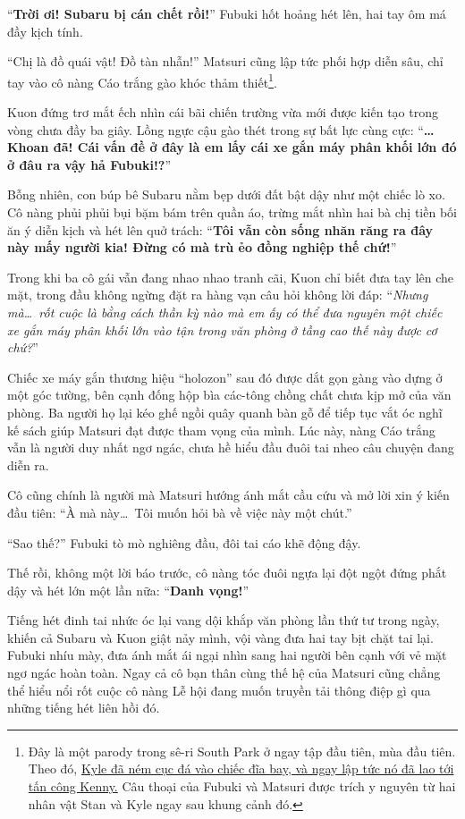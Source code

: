 \documentclass[../main.tex]{subfiles}
\begin{document}
``\textbf{Trời ơi! Subaru bị cán chết rồi!}'' Fubuki hốt hoảng hét lên, hai tay ôm má đầy kịch tính.

``Chị là đồ quái vật! Đồ tàn nhẫn!'' Matsuri cũng lập tức phối hợp diễn sâu, chỉ tay vào cô nàng Cáo trắng gào khóc thảm thiết\footnote{Đây là một parody trong sê-ri South Park ở ngay tập đầu tiên, mùa đầu tiên. Theo đó, \href{https://www.youtube.com/watch?v=kXxr9A_UBG4}{Kyle đã ném cục đá vào chiếc đĩa bay, và ngay lập tức nó đã lao tới tấn công Kenny.} Câu thoại của Fubuki và Matsuri được trích y nguyên từ hai nhân vật Stan và Kyle ngay sau khung cảnh đó.}.

Kuon đứng trơ mắt ếch nhìn cái bãi chiến trường vừa mới được kiến tạo trong vòng chưa đầy ba giây. Lồng ngực cậu gào thét trong sự bất lực cùng cực: ``\textbf{\dots Khoan đã! Cái vấn đề ở đây là em lấy cái xe gắn máy phân khối lớn đó ở đâu ra vậy hả Fubuki!?}''

Bỗng nhiên, con búp bê Subaru nằm bẹp dưới đất bật dậy như một chiếc lò xo. Cô nàng phủi phủi bụi bặm bám trên quần áo, trừng mắt nhìn hai bà chị tiền bối ăn ý diễn kịch và hét lên quở trách: ``\textbf{Tôi vẫn còn sống nhăn răng ra đây này mấy người kia! Đừng có mà trù ẻo đồng nghiệp thế chứ!}''

Trong khi ba cô gái vẫn đang nhao nhao tranh cãi, Kuon chỉ biết đưa tay lên che mặt, trong đầu không ngừng đặt ra hàng vạn câu hỏi không lời đáp: ``\textit{Nhưng mà\dots\ rốt cuộc là bằng cách thần kỳ nào mà em ấy có thể đưa nguyên một chiếc xe gắn máy phân khối lớn vào tận trong văn phòng ở tầng cao thế này được cơ chứ?}''

\ct

Chiếc xe máy gắn thương hiệu ``holozon'' sau đó được dắt gọn gàng vào dựng ở một góc tường, bên cạnh đống hộp bìa các-tông chồng chất chưa kịp mở của văn phòng. Ba người họ lại kéo ghế ngồi quây quanh bàn gỗ để tiếp tục vắt óc nghĩ kế sách giúp Matsuri đạt được tham vọng của mình. Lúc này, nàng Cáo trắng vẫn là người duy nhất ngơ ngác, chưa hề hiểu đầu đuôi tai nheo câu chuyện đang diễn ra.

Cô cũng chính là người mà Matsuri hướng ánh mắt cầu cứu và mở lời xin ý kiến đầu tiên: ``À mà này\dots\ Tôi muốn hỏi bà về việc này một chút.''

``Sao thế?'' Fubuki tò mò nghiêng đầu, đôi tai cáo khẽ động đậy.

Thế rồi, không một lời báo trước, cô nàng tóc đuôi ngựa lại đột ngột đứng phắt dậy và hét lớn một lần nữa: ``\textbf{Danh vọng!}''

Tiếng hét đinh tai nhức óc lại vang dội khắp văn phòng lần thứ tư trong ngày, khiến cả Subaru và Kuon giật nảy mình, vội vàng đưa hai tay bịt chặt tai lại. Fubuki nhíu mày, đưa ánh mắt ái ngại nhìn sang hai người bên cạnh với vẻ mặt ngơ ngác hoàn toàn. Ngay cả cô bạn thân cùng thế hệ của Matsuri cũng chẳng thể hiểu nổi rốt cuộc cô nàng Lễ hội đang muốn truyền tải thông điệp gì qua những tiếng hét liên hồi đó.
\end{document}
